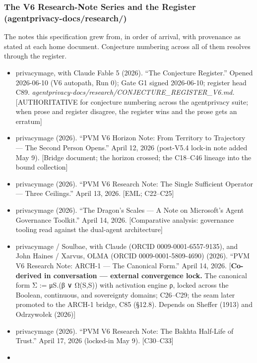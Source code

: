\documentclass[
]{article}
\providecommand{\tightlist}{%
  \setlength{\itemsep}{0pt}\setlength{\parskip}{0pt}}
\begin{document}
\subsubsection{The V6 Research-Note Series and the Register
(agentprivacy-docs/research/)}\label{the-v6-research-note-series-and-the-register-agentprivacy-docsresearch}

The notes this specification grew from, in order of arrival, with
provenance as stated at each home document. Conjecture numbering across
all of them resolves through the register.

\begin{itemize}
\tightlist
\item
  privacymage, with Claude Fable 5 (2026). ``The Conjecture Register.''
  Opened 2026-06-10 (V6 autopath, Run 0); Gate G1 signed 2026-06-10;
  register head C89.
  \emph{agentprivacy-docs/research/CONJECTURE\_REGISTER\_V6.md.}
  {[}AUTHORITATIVE for conjecture numbering across the agentprivacy
  suite; when prose and register disagree, the register wins and the
  prose gets an erratum{]}
\item
  privacymage (2026). ``PVM V6 Horizon Note: From Territory to
  Trajectory --- The Second Person Opens.'' April 12, 2026 (post-V5.4
  lock-in note added May 9). {[}Bridge document; the horizon crossed;
  the C18--C46 lineage into the bound collection{]}
\item
  privacymage (2026). ``PVM V6 Research Note: The Single Sufficient
  Operator --- Three Ceilings.'' April 13, 2026. {[}EML; C22--C25{]}
\item
  privacymage (2026). ``The Dragon's Scales --- A Note on Microsoft's
  Agent Governance Toolkit.'' April 14, 2026. {[}Comparative analysis:
  governance tooling read against the dual-agent architecture{]}
\item
  privacymage / Soulbae, with Claude (ORCID 0009-0001-6557-9135), and
  John Haines / Xarvus, OLMA (ORCID 0009-0001-5809-4690) (2026). ``PVM
  V6 Research Note: ARCH-1 --- The Canonical Form.'' April 14, 2026.
  {[}\textbf{Co-derived in conversation --- external convergence lock.}
  The canonical form Σ := μS.(β ∨ Ω(S,S)) with activation engine ρ,
  locked across the Boolean, continuous, and sovereignty domains;
  C26--C29; the seam later promoted to the ARCH-1 bridge, C85 (§12.8).
  Depends on Sheffer (1913) and Odrzywołek (2026){]}
\item
  privacymage (2026). ``PVM V6 Research Note: The Bakhta Half-Life of
  Trust.'' April 17, 2026 (locked-in May 9). {[}C30--C33{]}
\item

\end{itemize}
\end{document}
